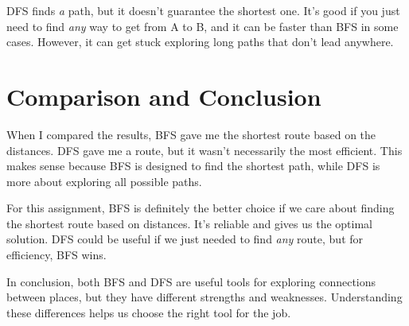 \documentclass{article}
\begin{document}
DFS finds \textit{a} path, but it doesn't guarantee the shortest one. It's good if you just need to find \textit{any} way to get from A to B, and it can be faster than BFS in some cases. However, it can get stuck exploring long paths that don't lead anywhere.

\section{Comparison and Conclusion}

When I compared the results, BFS gave me the shortest route based on the distances. DFS gave me a route, but it wasn't necessarily the most efficient. This makes sense because BFS is designed to find the shortest path, while DFS is more about exploring all possible paths.

For this assignment, BFS is definitely the better choice if we care about finding the shortest route based on distances. It's reliable and gives us the optimal solution. DFS could be useful if we just needed to find \textit{any} route, but for efficiency, BFS wins.

In conclusion, both BFS and DFS are useful tools for exploring connections between places, but they have different strengths and weaknesses. Understanding these differences helps us choose the right tool for the job.
\end{document}
